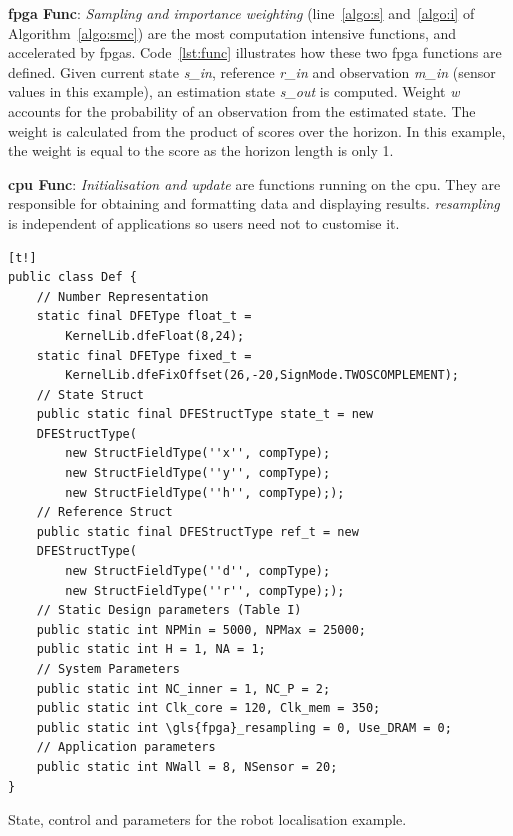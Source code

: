 \textbf{\gls{fpga} Func}: \textit{Sampling and importance weighting} (line~\ref{algo:s} and~\ref{algo:i} of Algorithm~\ref{algo:smc}) are the most computation intensive functions, and accelerated by \gls{fpga}s.
Code~\ref{lst:func} illustrates how these two \gls{fpga} functions are defined.
Given current state \textit{s\_in}, reference \textit{r\_in} and observation \textit{m\_in} (sensor values in this example), an estimation state \textit{s\_out} is computed.
Weight \textit{w} accounts for the probability of an observation from the estimated state.
The weight is calculated from the product of scores over the horizon.
In this example, the weight is equal to the score as the horizon length is only 1. 

\textbf{\gls{cpu} Func}: \textit{Initialisation and update} are functions running on the \gls{cpu}.
They are responsible for obtaining and formatting data and displaying results.
\textit{resampling} is independent of applications so users need not to customise it.

\begin{Code}
    \centering
\lstset{language=Java,
        basicstyle=\ttfamily\small,
				tabsize=2,
				numbers=left,
				numberstyle=\tiny,
				frame=tb,
				columns=fullflexible,
				showstringspaces=false
				}
\begin{lstlisting}[][t!]
public class Def {
	// Number Representation
	static final DFEType float_t = 
		KernelLib.dfeFloat(8,24);
	static final DFEType fixed_t = 
		KernelLib.dfeFixOffset(26,-20,SignMode.TWOSCOMPLEMENT);
	// State Struct
	public static final DFEStructType state_t = new 
	DFEStructType(
		new StructFieldType(''x'', compType);
		new StructFieldType(''y'', compType);
		new StructFieldType(''h'', compType););
	// Reference Struct
	public static final DFEStructType ref_t = new 
	DFEStructType(
		new StructFieldType(''d'', compType);
		new StructFieldType(''r'', compType););
	// Static Design parameters (Table I)
	public static int NPMin = 5000, NPMax = 25000;
	public static int H = 1, NA = 1;
	// System Parameters
	public static int NC_inner = 1, NC_P = 2;
	public static int Clk_core = 120, Clk_mem = 350;
	public static int \gls{fpga}_resampling = 0, Use_DRAM = 0;
	// Application parameters
	public static int NWall = 8, NSensor = 20;
}
\end{lstlisting}
\caption{\small State, control and parameters for the robot localisation example.}
\label{lst:def}
\end{Code}

